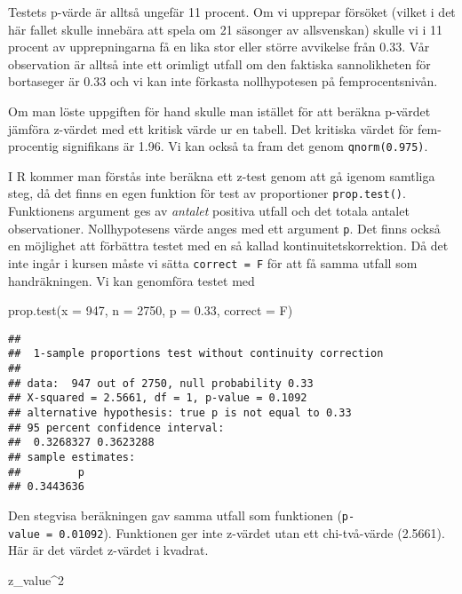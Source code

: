 \documentclass[
]{book}
\newenvironment{Shaded}{\begin{snugshade}}{\end{snugshade}}
\newcommand{\AttributeTok}[1]{\textcolor[rgb]{0.77,0.63,0.00}{#1}}
\newcommand{\DecValTok}[1]{\textcolor[rgb]{0.00,0.00,0.81}{#1}}
\newcommand{\FloatTok}[1]{\textcolor[rgb]{0.00,0.00,0.81}{#1}}
\newcommand{\FunctionTok}[1]{\textcolor[rgb]{0.00,0.00,0.00}{#1}}
\newcommand{\NormalTok}[1]{#1}
\newcommand{\SpecialCharTok}[1]{\textcolor[rgb]{0.00,0.00,0.00}{#1}}
\theoremstyle{definition}
\theoremstyle{definition}
\theoremstyle{definition}
\theoremstyle{definition}
\theoremstyle{remark}
\begin{document}
Testets p-värde är alltså ungefär 11 procent. Om vi upprepar försöket (vilket i det här fallet skulle innebära att spela om 21 säsonger av allsvenskan) skulle vi i 11 procent av upprepningarna få en lika stor eller större avvikelse från 0.33. Vår observation är alltså inte ett orimligt utfall om den faktiska sannolikheten för bortaseger är 0.33 och vi kan inte förkasta nollhypotesen på femprocentsnivån.

Om man löste uppgiften för hand skulle man istället för att beräkna p-värdet jämföra z-värdet med ett kritisk värde ur en tabell. Det kritiska värdet för fem-procentig signifikans är 1.96. Vi kan också ta fram det genom \texttt{qnorm(0.975)}.

I R kommer man förstås inte beräkna ett z-test genom att gå igenom samtliga steg, då det finns en egen funktion för test av proportioner \texttt{prop.test()}. Funktionens argument ges av \emph{antalet} positiva utfall och det totala antalet observationer. Nollhypotesens värde anges med ett argument \texttt{p}. Det finns också en möjlighet att förbättra testet med en så kallad kontinuitetskorrektion. Då det inte ingår i kursen måste vi sätta \texttt{correct\ =\ F} för att få samma utfall som handräkningen. Vi kan genomföra testet med

\begin{Shaded}
\begin{Highlighting}[]
\FunctionTok{prop.test}\NormalTok{(}\AttributeTok{x =} \DecValTok{947}\NormalTok{, }\AttributeTok{n =} \DecValTok{2750}\NormalTok{, }\AttributeTok{p =} \FloatTok{0.33}\NormalTok{, }\AttributeTok{correct =}\NormalTok{ F)}
\end{Highlighting}
\end{Shaded}

\begin{verbatim}
## 
##  1-sample proportions test without continuity correction
## 
## data:  947 out of 2750, null probability 0.33
## X-squared = 2.5661, df = 1, p-value = 0.1092
## alternative hypothesis: true p is not equal to 0.33
## 95 percent confidence interval:
##  0.3268327 0.3623288
## sample estimates:
##         p 
## 0.3443636
\end{verbatim}

Den stegvisa beräkningen gav samma utfall som funktionen (\texttt{p-value\ =\ 0.01092}). Funktionen ger inte z-värdet utan ett chi-två-värde (2.5661). Här är det värdet z-värdet i kvadrat.

\begin{Shaded}
\begin{Highlighting}[]
\NormalTok{z\_value}\SpecialCharTok{\^{}}\DecValTok{2}
\end{Highlighting}
\end{Shaded}
\end{document}
